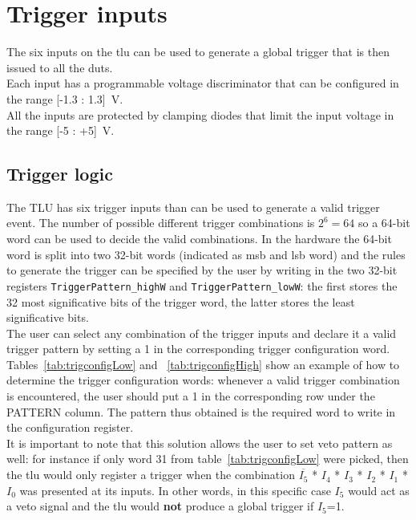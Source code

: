 \chapter{Trigger inputs}\label{ch:triggerinputs}
The six inputs on the \gls{tlu} can be used to generate a global trigger that is then issued to all the \gls{dut}s.\\
Each input has a programmable voltage discriminator that can be configured in the range [-1.3 : 1.3]~V.\\
All the inputs are protected by clamping diodes that limit the input voltage in the range [-5 : +5]~V.

\section{Trigger logic}\label{ch:triggerLogic}
The TLU has six trigger inputs than can be used to generate a valid trigger event. The number of possible different trigger combinations is $2^6= 64$ so a 64-bit word can be used to decide the valid combinations. In the hardware the 64-bit word is split into two 32-bit words (indicated as \gls{msb} and \gls{lsb} word) and the rules to generate the trigger can be specified by the user by writing in the two 32-bit registers \verb|TriggerPattern_highW| and \verb|TriggerPattern_lowW|: the first stores the 32 most significative bits of the trigger word, the latter stores the least significative bits.\\
The user can select any combination of the trigger inputs and declare it a valid trigger pattern by setting a 1 in the corresponding trigger configuration word.
Tables~\ref{tab:trigconfigLow} and ~\ref{tab:trigconfigHigh} show an example of how to determine the trigger configuration words: whenever a valid trigger combination is encountered, the user should put a 1 in the corresponding row under the PATTERN column. The pattern thus obtained is the required word to write in the configuration register.\\
It is important to note that this solution allows the user to set veto pattern as well: for instance if only word 31 from table~\ref{tab:trigconfigLow} were picked, then the \gls{tlu} would only register a trigger when the combination $\overline{I_{5}}$ * $I_{4}$ * $I_{3}$ * $I_{2}$ * $I_{1}$ * $I_{0}$ was presented at its inputs. In other words, in this specific case $I_{5}$ would act as a veto signal and the \gls{tlu} would \textbf{not} produce a global trigger if $I_{5}$=1.

